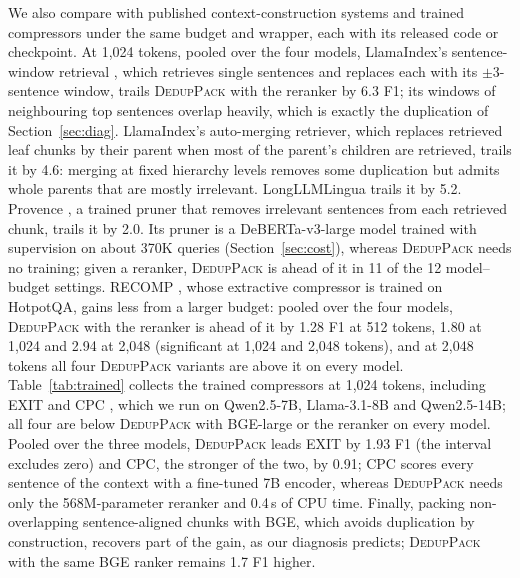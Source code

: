 \documentclass[11pt]{article}
\newcommand{\spk}{\textsc{DedupPack}}
\begin{document}
We also compare with published context-construction systems and trained compressors under the same budget and wrapper, each with its released code or checkpoint. At 1,024 tokens, pooled over the four models, LlamaIndex's sentence-window retrieval \citep{liu2022llamaindex}, which retrieves single sentences and replaces each with its $\pm$3-sentence window, trails \spk{} with the reranker by 6.3 F1; its windows of neighbouring top sentences overlap heavily, which is exactly the duplication of Section~\ref{sec:diag}. LlamaIndex's auto-merging retriever, which replaces retrieved leaf chunks by their parent when most of the parent's children are retrieved, trails it by 4.6: merging at fixed hierarchy levels removes some duplication but admits whole parents that are mostly irrelevant. LongLLMLingua \citep{jiang2024longllmlingua} trails it by 5.2. Provence \citep{chirkova2025provence}, a trained pruner that removes irrelevant sentences from each retrieved chunk, trails it by 2.0. Its pruner is a DeBERTa-v3-large model trained with supervision on about 370K queries (Section~\ref{sec:cost}), whereas \spk{} needs no training; given a reranker, \spk{} is ahead of it in 11 of the 12 model--budget settings. RECOMP \citep{xu2023recomp}, whose extractive compressor is trained on HotpotQA, gains less from a larger budget: pooled over the four models, \spk{} with the reranker is ahead of it by 1.28 F1 at 512 tokens, 1.80 at 1,024 and 2.94 at 2,048 (significant at 1,024 and 2,048 tokens), and at 2,048 tokens all four \spk{} variants are above it on every model. Table~\ref{tab:trained} collects the trained compressors at 1,024 tokens, including EXIT \citep{hwang2025exit} and CPC \citep{liskavets2025cpc}, which we run on Qwen2.5-7B, Llama-3.1-8B and Qwen2.5-14B; all four are below \spk{} with BGE-large or the reranker on every model. Pooled over the three models, \spk{} leads EXIT by 1.93 F1 (the interval excludes zero) and CPC, the stronger of the two, by 0.91; CPC scores every sentence of the context with a fine-tuned 7B encoder, whereas \spk{} needs only the 568M-parameter reranker and 0.4\,s of CPU time. Finally, packing non-overlapping sentence-aligned chunks with BGE, which avoids duplication by construction, recovers part of the gain, as our diagnosis predicts; \spk{} with the same BGE ranker remains 1.7 F1 higher.
\end{document}
